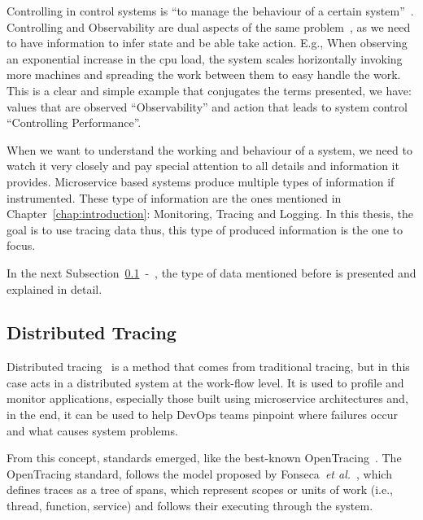 Controlling in control systems is ``to manage the behaviour of a certain system''~\cite{control_systems}. Controlling and Observability are dual aspects of the same problem~\cite{observability}, as we need to have information to infer state and be able take action. E.g., When observing an exponential increase in the \gls{cpu} load, the system scales horizontally invoking more machines and spreading the work between them to easy handle the work. This is a clear and simple example that conjugates the terms presented, we have: values that are observed ``Observability'' and action that leads to system control ``Controlling Performance''.

When we want to understand the working and behaviour of a system, we need to watch it very closely and pay special attention to all details and information it provides. Microservice based systems produce multiple types of information if instrumented. These type of information are the ones mentioned in Chapter~\ref{chap:introduction}: Monitoring, Tracing and Logging. In this thesis, the goal is to use tracing data thus, this type of produced information is the one to focus.

In the next Subsection~\ref{subsec:distributed_tracing}~-~, the type of data mentioned before is presented and explained in detail.

\subsection{Distributed Tracing}
\label{subsec:distributed_tracing}


Distributed tracing~\cite{Sambasivan2016a} is a method that comes from traditional tracing, but in this case acts in a distributed system at the work-flow level. It is used to profile and monitor applications, especially those built using microservice architectures and, in the end, it can be used to help DevOps teams pinpoint where failures occur and what causes system problems.

From this concept, standards emerged, like the best-known OpenTracing~\cite{open_tracing_data_model_specification}. The OpenTracing standard, follows the model proposed by Fonseca~\textit{et al.}~\cite{fonseca2007x}, which defines traces as a tree of spans, which represent scopes or units of work (i.e., thread, function, service) and follows their executing through the system.

